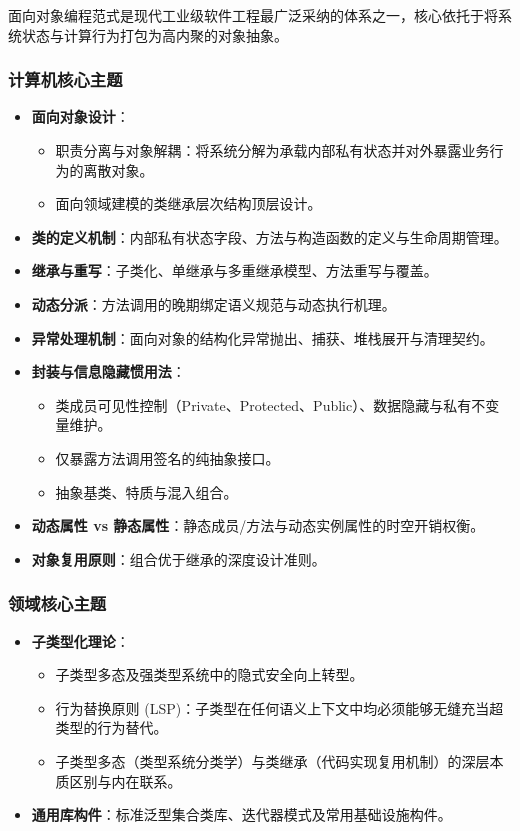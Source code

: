 面向对象编程范式是现代工业级软件工程最广泛采纳的体系之一，核心依托于将系统状态与计算行为打包为高内聚的对象抽象。

\subsubsection{计算机核心主题}
\begin{itemize}
    \item \textbf{面向对象设计}：
    \begin{itemize}
        \item 职责分离与对象解耦：将系统分解为承载内部私有状态并对外暴露业务行为的离散对象。
        \item 面向领域建模的类继承层次结构顶层设计。
    \end{itemize}
    \item \textbf{类的定义机制}：内部私有状态字段、方法与构造函数的定义与生命周期管理。
    \item \textbf{继承与重写}：子类化、单继承与多重继承模型、方法重写与覆盖。
    \item \textbf{动态分派}：方法调用的晚期绑定语义规范与动态执行机理。
    \item \textbf{异常处理机制}：面向对象的结构化异常抛出、捕获、堆栈展开与清理契约。
    \item \textbf{封装与信息隐藏惯用法}：
    \begin{itemize}
        \item 类成员可见性控制（Private、Protected、Public）、数据隐藏与私有不变量维护。
        \item 仅暴露方法调用签名的纯抽象接口。
        \item 抽象基类、特质与混入组合。
    \end{itemize}
    \item \textbf{动态属性 vs 静态属性}：静态成员/方法与动态实例属性的时空开销权衡。
    \item \textbf{对象复用原则}：组合优于继承的深度设计准则。
\end{itemize}

\subsubsection{领域核心主题}
\begin{itemize}
    \item \textbf{子类型化理论}：
    \begin{itemize}
        \item 子类型多态及强类型系统中的隐式安全向上转型。
        \item 行为替换原则 (LSP)：子类型在任何语义上下文中均必须能够无缝充当超类型的行为替代。
        \item 子类型多态（类型系统分类学）与类继承（代码实现复用机制）的深层本质区别与内在联系。
    \end{itemize}
    \item \textbf{通用库构件}：标准泛型集合类库、迭代器模式及常用基础设施构件。
\end{itemize}

